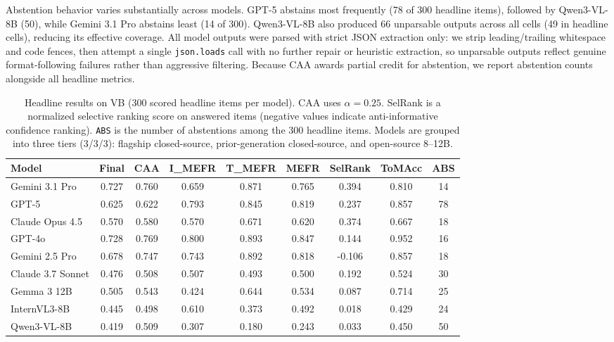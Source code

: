 \documentclass[11pt]{article}
\newcommand{\benchmarkname}{\textsc{VB}}
\begin{document}
Abstention behavior varies substantially across models. GPT-5 abstains most frequently (78 of 300 headline items), followed by Qwen3-VL-8B (50), while Gemini 3.1 Pro abstains least (14 of 300). Qwen3-VL-8B also produced 66 unparsable outputs across all cells (49 in headline cells), reducing its effective coverage. All model outputs were parsed with strict JSON extraction only: we strip leading/trailing whitespace and code fences, then attempt a single \texttt{json.loads} call with no further repair or heuristic extraction, so unparsable outputs reflect genuine format-following failures rather than aggressive filtering. Because CAA awards partial credit for abstention, we report abstention counts alongside all headline metrics.

\begin{table}[t]
\centering
\small
\setlength{\tabcolsep}{3.5pt}
\caption{Headline results on \benchmarkname{} (300 scored headline items per model). CAA uses \(\alpha=0.25\). SelRank is a normalized selective ranking score on answered items (negative values indicate anti-informative confidence ranking). \texttt{ABS} is the number of abstentions among the 300 headline items. Models are grouped into three tiers (3/3/3): flagship closed-source, prior-generation closed-source, and open-source 8--12B.}
\label{tab:main_results}
\begin{tabular}{l
S[table-format=1.3]
S[table-format=1.3]
S[table-format=1.3]
S[table-format=1.3]
S[table-format=1.3]
S[table-format=2.3]
S[table-format=1.3]
S[table-format=2.0]
}
\toprule
\textbf{Model} & {\textbf{Final}} & {\textbf{CAA}} & {\textbf{I\_MEFR}} & {\textbf{T\_MEFR}} & {\textbf{MEFR}} & {\textbf{SelRank}} & {\textbf{ToMAcc}} & {\textbf{ABS}} \\
\midrule
Gemini 3.1 Pro    & 0.727 & 0.760 & 0.659 & 0.871 & 0.765 &  0.394 & 0.810 & 14 \\
GPT-5             & 0.625 & 0.622 & 0.793 & 0.845 & 0.819 &  0.237 & 0.857 & 78 \\
Claude Opus 4.5   & 0.570 & 0.580 & 0.570 & 0.671 & 0.620 &  0.374 & 0.667 & 18 \\
\midrule
GPT-4o            & 0.728 & 0.769 & 0.800 & 0.893 & 0.847 &  0.144 & 0.952 & 16 \\
Gemini 2.5 Pro    & 0.678 & 0.747 & 0.743 & 0.892 & 0.818 & -0.106 & 0.857 & 18 \\
Claude 3.7 Sonnet & 0.476 & 0.508 & 0.507 & 0.493 & 0.500 &  0.192 & 0.524 & 30 \\
\midrule
Gemma 3 12B       & 0.505 & 0.543 & 0.424 & 0.644 & 0.534 &  0.087 & 0.714 & 25 \\
InternVL3-8B      & 0.445 & 0.498 & 0.610 & 0.373 & 0.492 &  0.018 & 0.429 & 24 \\
Qwen3-VL-8B      & 0.419 & 0.509 & 0.307 & 0.180 & 0.243 &  0.033 & 0.450 & 50 \\
\bottomrule
\end{tabular}
\end{table}
\end{document}
